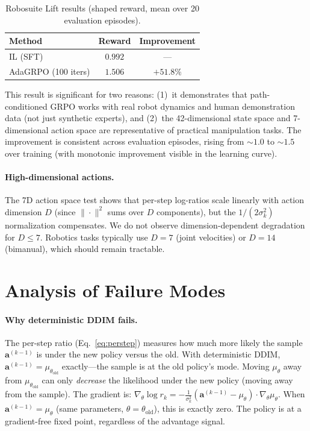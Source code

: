 \documentclass{article}
\newcommand{\ba}{\mathbf{a}}
\begin{document}
\begin{table}[h]
\centering
\caption{Robosuite Lift results (shaped reward, mean over 20 evaluation episodes).}
\label{tab:lift}
\begin{tabular}{lcc}
\toprule
Method & Reward & Improvement \\
\midrule
IL (SFT) & $0.992$ & --- \\
AdaGRPO (100 iters) & $\mathbf{1.506}$ & $+51.8\%$ \\
\bottomrule
\end{tabular}
\end{table}

This result is significant for two reasons: (1)~it demonstrates that path-conditioned GRPO works with real robot dynamics and human demonstration data (not just synthetic experts), and (2)~the 42-dimensional state space and 7-dimensional action space are representative of practical manipulation tasks. The improvement is consistent across evaluation episodes, rising from $\sim 1.0$ to $\sim 1.5$ over training (with monotonic improvement visible in the learning curve).

\paragraph{High-dimensional actions.}
The 7D action space test shows that per-step log-ratios scale linearly with action dimension $D$ (since $\|\cdot\|^2$ sums over $D$ components), but the $1/(2\sigma_k^2)$ normalization compensates.
We do not observe dimension-dependent degradation for $D \leq 7$.
Robotics tasks typically use $D = 7$ (joint velocities) or $D = 14$ (bimanual), which should remain tractable.


\section{Analysis of Failure Modes}
\label{sec:failure}

\paragraph{Why deterministic DDIM fails.}
The per-step ratio (Eq.~\ref{eq:perstep}) measures how much more likely the sample $\ba^{(k-1)}$ is under the new policy versus the old.
With deterministic DDIM, $\ba^{(k-1)} = \mu_{\theta_\text{old}}$ exactly---the sample is at the old policy's mode.
Moving $\mu_\theta$ away from $\mu_{\theta_\text{old}}$ can only \emph{decrease} the likelihood under the new policy (moving away from the sample).
The gradient is: $\nabla_\theta \log r_k = -\frac{1}{\sigma_k^2}(\ba^{(k-1)} - \mu_\theta) \cdot \nabla_\theta \mu_\theta$.
When $\ba^{(k-1)} = \mu_\theta$ (same parameters, $\theta = \theta_\text{old}$), this is exactly zero.
The policy is at a gradient-free fixed point, regardless of the advantage signal.
\end{document}
